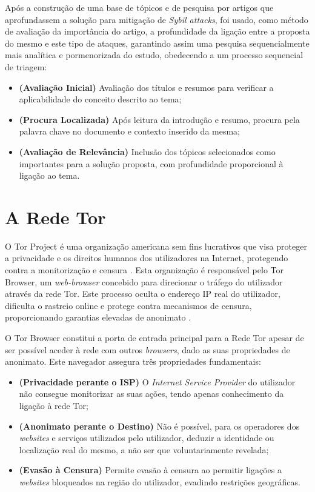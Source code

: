 Após a construção de uma base de tópicos e de pesquisa por artigos que aprofundassem a solução para mitigação de \textit{Sybil attacks}, foi usado, como método de avaliação da importância do artigo, a profundidade da ligação entre a proposta do mesmo e este tipo de ataques, garantindo assim uma pesquisa sequencialmente mais analítica e pormenorizada do estudo, obedecendo a um processo sequencial de triagem:

\begin{itemize}
    \item \textbf{(Avaliação Inicial)} Avaliação dos títulos e resumos para verificar a aplicabilidade do conceito descrito ao tema;
    \item \textbf{(Procura Localizada)} Após leitura da introdução e resumo, procura pela palavra chave no documento e contexto inserido da mesma;
    \item \textbf{(Avaliação de Relevância)} Inclusão dos tópicos selecionados como importantes para a solução proposta, com profundidade proporcional à ligação ao tema.
\end{itemize}

\section{A Rede Tor}

O Tor Project é uma organização americana sem fins lucrativos que visa proteger a privacidade e os direitos humanos dos utilizadores na Internet, protegendo contra a monitorização e censura \cite{tor}. Esta organização é responsável pelo Tor Browser, um \textit{web-browser} concebido para direcionar o tráfego do utilizador através da rede Tor. Este processo oculta o endereço IP real do utilizador, dificulta o rastreio online e protege contra mecanismos de censura, proporcionando garantias elevadas de anonimato \cite{browser}.

O Tor Browser constitui a porta de entrada principal para a Rede Tor apesar de ser possível aceder à rede com outros \textit{browsers}, dado as suas propriedades de anonimato. Este navegador assegura três propriedades fundamentais:

\begin{itemize}
    \item \textbf{(Privacidade perante o ISP)} O \textit{Internet Service Provider} do utilizador não consegue monitorizar as suas ações, tendo apenas conhecimento da ligação à rede Tor;
    \item \textbf{(Anonimato perante o Destino)} Não é possível, para os operadores dos \textit{websites} e serviços utilizados pelo utilizador, deduzir a identidade ou localização real do mesmo, a não ser que voluntariamente revelada;
    \item \textbf{(Evasão à Censura)} Permite evasão à censura ao permitir ligações a \textit{websites} bloqueados na região do utilizador, evadindo restrições geográficas.
\end{itemize}

